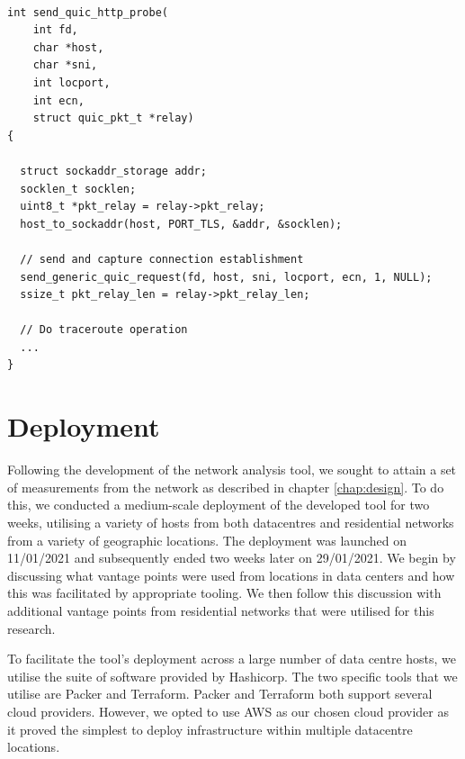\documentclass{l4proj}
\begin{document}
\begin{lstlisting}[caption={A demonstration of launching traceroutes under Quic, leveraging support from lsquic to generate a suitable connection establishment packet, which is then utilised under a standard traceroute operation. The use of synchronisation primitives and error checking have been removed for the sake of brevity.}]

int send_quic_http_probe(
    int fd, 
    char *host, 
    char *sni, 
    int locport, 
    int ecn, 
    struct quic_pkt_t *relay)
{
  
  struct sockaddr_storage addr;
  socklen_t socklen;
  uint8_t *pkt_relay = relay->pkt_relay;
  host_to_sockaddr(host, PORT_TLS, &addr, &socklen);
  
  // send and capture connection establishment
  send_generic_quic_request(fd, host, sni, locport, ecn, 1, NULL);
  ssize_t pkt_relay_len = relay->pkt_relay_len;
  
  // Do traceroute operation
  ... 
}

\end{lstlisting}

\section{Deployment}

Following the development of the network analysis tool, we sought to attain a set of measurements from the network as described in chapter \ref{chap:design}. To do this, we conducted a medium-scale deployment of the developed tool for two weeks, utilising a variety of hosts from both datacentres and residential networks from a variety of geographic locations. The deployment was launched on 11/01/2021 and subsequently ended two weeks later on 29/01/2021. We begin by discussing what vantage points were used from locations in data centers and how this was facilitated by appropriate tooling. We then follow this discussion with additional vantage points from residential networks that were utilised for this research.

To facilitate the tool's deployment across a large number of data centre hosts, we utilise the suite of software provided by Hashicorp. The two specific tools that we utilise are Packer and Terraform. Packer and Terraform both support several cloud providers. However, we opted to use AWS as our chosen cloud provider as it proved the simplest to deploy infrastructure within multiple datacentre locations.
\end{document}

